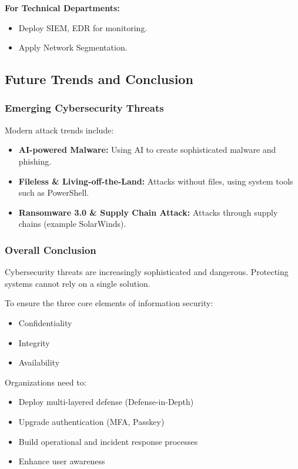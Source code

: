 \textbf{For Technical Departments:}
\begin{itemize}
    \item Deploy SIEM, EDR for monitoring.
    \item Apply Network Segmentation.
\end{itemize}

\subsection{Future Trends and Conclusion}

\subsubsection{Emerging Cybersecurity Threats}

Modern attack trends include:

\begin{itemize}
    \item \textbf{AI-powered Malware:} Using AI to create sophisticated malware and phishing.
    
    \item \textbf{Fileless \& Living-off-the-Land:} Attacks without files, using system tools such as PowerShell.
    
    \item \textbf{Ransomware 3.0 \& Supply Chain Attack:} Attacks through supply chains (example SolarWinds).
\end{itemize}

\subsubsection{Overall Conclusion}

Cybersecurity threats are increasingly sophisticated and dangerous. Protecting systems cannot rely on a single solution.

To ensure the three core elements of information security:

\begin{itemize}
    \item Confidentiality
    \item Integrity
    \item Availability
\end{itemize}

Organizations need to:

\begin{itemize}
    \item Deploy multi-layered defense (Defense-in-Depth)
    \item Upgrade authentication (MFA, Passkey)
    \item Build operational and incident response processes
    \item Enhance user awareness
\end{itemize}


